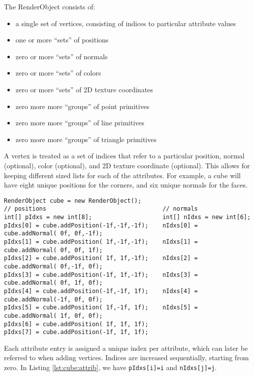 \documentclass{article}
\newenvironment{tightemize}{\begin{itemize}[nolistsep,noitemsep]}{\end{itemize}}
\begin{document}
The RenderObject consists of:
\begin{tightemize}
   \item a single set of vertices, consisting of indices to particular attribute values
   \item one or more ``sets'' of positions
   \item zero or more ``sets'' of normals
   \item zero or more ``sets'' of colors
   \item zero or more ``sets'' of 2D texture coordinates
   \item zero more more ``groups'' of point primitives
   \item zero more more ``groups'' of line primitives
   \item zero more more ``groups'' of triangle primitives
\end{tightemize}
A vertex is treated as a set of indices that refer to a particular position, normal (optional),
color (optional), and 2D texture coordinate (optional).  This allows for keeping different sized
lists for each of the attributes.  For example, a cube will have eight unique positions for the 
corners, and six unique normals for the faces.  
\begin{lstlisting}[caption=Adding attributes to make a cube,label=lst:cube:attrib]
RenderObject cube = new RenderObject();
// positions                                 // normals
int[] pIdxs = new int[8];                    int[] nIdxs = new int[6];
pIdxs[0] = cube.addPosition(-1f,-1f,-1f);    nIdxs[0] = cube.addNormal( 0f, 0f,-1f);
pIdxs[1] = cube.addPosition( 1f,-1f,-1f);    nIdxs[1] = cube.addNormal( 0f, 0f, 1f);
pIdxs[2] = cube.addPosition( 1f, 1f,-1f);    nIdxs[2] = cube.addNormal( 0f,-1f, 0f);
pIdxs[3] = cube.addPosition(-1f, 1f,-1f);    nIdxs[3] = cube.addNormal( 0f, 1f, 0f);
pIdxs[4] = cube.addPosition(-1f,-1f, 1f);    nIdxs[4] = cube.addNormal(-1f, 0f, 0f);
pIdxs[5] = cube.addPosition( 1f,-1f, 1f);    nIdxs[5] = cube.addNormal( 1f, 0f, 0f);
pIdxs[6] = cube.addPosition( 1f, 1f, 1f);
pIdxs[7] = cube.addPosition(-1f, 1f, 1f);
\end{lstlisting}
Each attribute entry is assigned a unique index per attribute, which can later be referred to 
when adding vertices.  Indices are increased sequentially, starting from zero.  In 
Listing \ref{lst:cube:attrib}, we have \lstinline{pIdxs[i]=i} and \lstinline{nIdxs[j]=j}.
\end{document}
